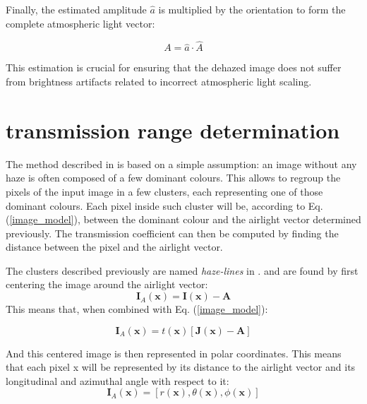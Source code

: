 \documentclass[conference]{IEEEtran}
\begin{document}
Finally, the estimated amplitude \( \hat{a} \) is multiplied by the orientation to form the complete atmospheric light vector:

\begin{equation}
\label{airlight}
A = \hat{a} \cdot \hat{A}
\end{equation}

This estimation is crucial for ensuring that the dehazed image does not suffer from brightness artifacts related to incorrect atmospheric light scaling.

\section{transmission range determination}
The method described in \cite{dehaze} is based on a simple assumption: an image without any haze is often composed of a few dominant colours. This allows to regroup the pixels of the input image in a few clusters, each representing one of those dominant colours. Each pixel inside such cluster will be, according to Eq. (\ref{image_model}), between the dominant colour and the airlight vector determined previously. The transmission coefficient can then be computed by finding the distance between the pixel and the airlight vector.\par
The clusters described previously are named \textit{haze-lines} in \cite{dehaze}. and are found by first centering the image around the airlight vector:
\begin{equation}
    \label{eq:centered_image}
    \mathbf{I}_A(\mathbf{x}) = \mathbf{I}(\mathbf{x}) - \mathbf{A}
\end{equation}
This means that, when combined with Eq. (\ref{image_model}):

\begin{equation}
    \label{eq:centered_image_model}
    \mathbf{I}_A(\mathbf{x}) = t(\mathbf{x}) \left[\mathbf{J}(\mathbf{x}) - \mathbf{A}\right]
\end{equation}

And this centered image is then represented in polar coordinates. This means that each pixel x will be represented by its distance to the airlight vector and its longitudinal and azimuthal angle with respect to it:
\begin{equation}
    \label{eq:polar_coordinates}
    \mathbf{I}_A(\mathbf{x}) = \left[r(\mathbf{x}), \theta(\mathbf{x}), \phi(\mathbf{x})\right]
\end{equation}
\end{document}
